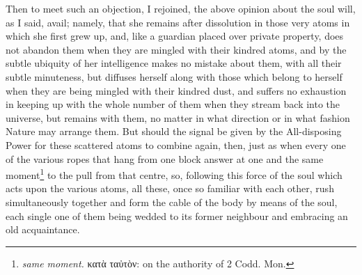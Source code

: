 Then to meet such an objection, I rejoined, the above opinion about the soul will, as I said, avail; namely, that she remains after dissolution in those very atoms in which she first grew up, and, like a guardian placed over private property, does not abandon them when they are mingled with their kindred atoms, and by the subtle ubiquity of her intelligence makes no mistake about them, with all their subtle minuteness, but diffuses herself along with those which belong to herself when they are being mingled with their kindred dust, and suffers no exhaustion in keeping up with the whole number of them when they stream back into the universe, but remains with them, no matter in what direction or in what fashion Nature may arrange them. But should the signal be given by the All-disposing Power for these scattered atoms to combine again, then, just as when every one of the various ropes that hang from one block answer at one and the same moment\footnote{\emph{same moment.} \textgreek{κατὰ ταὐτὸν}: on the authority of 2 Codd. Mon.} to the pull from that centre, so, following this force of the soul which acts upon the various atoms, all these, once so familiar with each other, rush simultaneously together and form the cable of the body by means of the soul, each single one of them being wedded to its former neighbour and embracing an old acquaintance.

